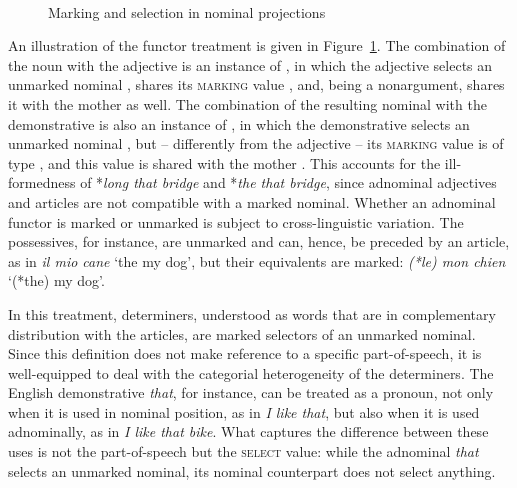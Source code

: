 \documentclass[output=paper
	        ,collection
	        ,collectionchapter
 	        ,biblatex
                ,babelshorthands
                ,newtxmath
                ,draftmode
                ,colorlinks, citecolor=brown
]{langscibook}
\begin{document}
\begin{exe}
\ex\label{hein} 
 \impl \\
\end{exe}    

\begin{figure}
\centering
{}
\caption{\label{markyy} Marking and selection in nominal projections}
\end{figure}

An illustration of the functor treatment is given in Figure~\ref{markyy}.
The combination of the noun with the adjective is an instance of , 
in which the adjective selects an unmarked nominal ,  
shares its \textsc{marking} value , and, being a nonargument, 
shares it with the mother as well. 
The combination of the resulting nominal with the demonstrative is also 
an instance of ,
in which the demonstrative selects an unmarked nominal , 
but -- differently from the adjective -- its \textsc{marking} value is of type 
, and this value is shared with the mother .    
This accounts for the ill-formedness of 
*\emph{long that bridge} and *\emph{the that bridge}, since 
adnominal adjectives and articles are not compatible with a marked nominal.  
Whether an adnominal functor is marked or unmarked is subject to cross-linguistic variation. 
The  possessives, for instance, are unmarked and can, hence, be preceded 
by an article, as in \emph{il mio cane} `the my dog', but   
their  equivalents are marked: \emph{(*le) mon chien} `(*the) my dog'. 

In this treatment, determiners, understood as words that are in complementary distribution with 
the articles, are marked selectors of an unmarked nominal. Since this definition does not 
make reference to a specific part-of-speech, it is well-equipped to deal with the categorial 
heterogeneity of the determiners. The English demonstrative \emph{that}, for instance, 
can be treated as a pronoun, not only when it is used in nominal position, as in 
\emph{I like that}, but also when it is used adnominally, as in \emph{I like that bike}.   
What captures the difference between these uses is not the part-of-speech but  
the \textsc{select} value: while the adnominal \emph{that} selects an unmarked nominal, 
its nominal counterpart does not select anything.      
\end{document}
